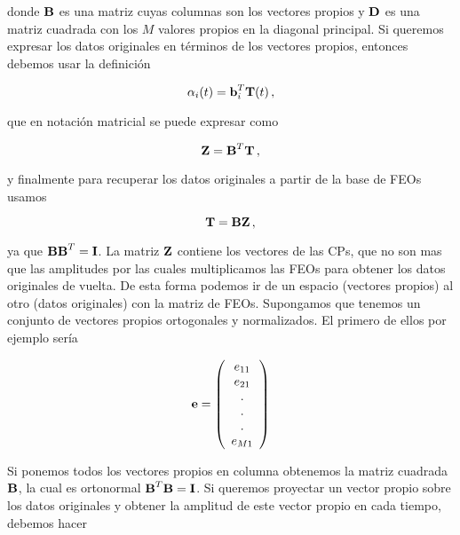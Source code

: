 \documentclass[
]{agujournal2019}
\begin{document}
donde \({\textbf B}\) es una matriz cuyas columnas son los vectores
propios y \({\textbf D}\) es una matriz cuadrada con los \(M\) valores
propios en la diagonal principal. Si queremos expresar los datos
originales en términos de los vectores propios, entonces debemos usar la
definición

\[\alpha_i(t)={\textbf b}^T_{i}{\textbf T}(t)\,,\]

que en notación matricial se puede expresar como

\[{\textbf Z}={\textbf B}^T{\textbf T}\,,\]

y finalmente para recuperar los datos originales a partir de la base de
FEOs usamos

\[{\textbf T}={\textbf B}{\textbf Z}\,,\]

ya que \({\textbf B}{\textbf B}^T={\textbf I}\). La matriz
\({\textbf Z}\) contiene los vectores de las CPs, que no son mas que las
amplitudes por las cuales multiplicamos las FEOs para obtener los datos
originales de vuelta. De esta forma podemos ir de un espacio (vectores
propios) al otro (datos originales) con la matriz de FEOs. Supongamos
que tenemos un conjunto de vectores propios ortogonales y normalizados.
El primero de ellos por ejemplo sería

\begin{equation}
{\textbf e}=\left(\begin{array}{c}
   e_{11} \\
   e_{21} \\
     .\\
     .\\
     .\\
   e_{M1} \\
 \end{array}\right)
\end{equation}

Si ponemos todos los vectores propios en columna obtenemos la matriz
cuadrada \({\textbf B}\), la cual es ortonormal
\({\textbf B}^T{\textbf B}={\textbf I}\). Si queremos proyectar un
vector propio sobre los datos originales y obtener la amplitud de este
vector propio en cada tiempo, debemos hacer
\end{document}
